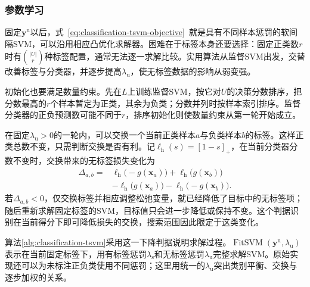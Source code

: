 \subsubsection{参数学习}
\label{sec:classification-tsvm-learning}

固定$\bm{y}^{\mathrm{u}}$以后，式~\eqref{eq:classification-tsvm-objective}~就是具有不同样本惩罚的软间隔SVM，可以沿用相应凸优化求解器。困难在于标签本身还要选择：固定正类数$r$时有$\binom{|U|}{r}$种标签配置，通常无法逐一求解比较。实用算法从监督SVM出发，交替改善标签与分类器，并逐步提高$\lambda_{\mathrm{u}}$，使无标签数据的影响从弱变强。

初始化也要满足数量约束。先在$L$上训练监督SVM，按它对$U$的决策分数排序，把分数最高的$r$个样本暂定为正类，其余为负类；分数并列时按样本索引排序。监督分类器的正负预测数可能不同于$r$，排序初始化则使数量约束从第一轮开始成立。

在固定$\lambda_{\mathrm{u}}>0$的一轮内，可以交换一个当前正类样本$a$与负类样本$b$的标签。这样正类总数不变，只需判断交换是否有利。记$\ell_{\mathrm{h}}(s)=[1-s]_+$，在当前分类器分数不变时，交换带来的无标签损失变化为
\begin{equation}
  \label{eq:classification-tsvm-swap}
  \begin{aligned}
    \Delta_{a,b}
      ={}&\ell_{\mathrm{h}}\bigl(-g(\bm{x}_a)\bigr)
          +\ell_{\mathrm{h}}\bigl(g(\bm{x}_b)\bigr)\\
       &-\ell_{\mathrm{h}}\bigl(g(\bm{x}_a)\bigr)
          -\ell_{\mathrm{h}}\bigl(-g(\bm{x}_b)\bigr).
  \end{aligned}
\end{equation}
若$\Delta_{a,b}<0$，仅交换标签并相应调整松弛变量，就已经降低了目标中的无标签项；随后重新求解固定标签的SVM，目标值只会进一步降低或保持不变。这个判据识别在当前得分下即可降低损失的交换，搜索范围因此限定于这类变化。

算法\ref{alg:classification-tsvm}采用这一下降判据说明求解过程。$\operatorname{FitSVM}(\bm{y}^{\mathrm{u}},\lambda_{\mathrm{u}})$表示在当前固定标签下，用有标签惩罚$\lambda_{\mathrm{s}}$和无标签惩罚$\lambda_{\mathrm{u}}$完整求解SVM。原始实现还可以为未标注正负类使用不同惩罚；这里用统一的$\lambda_{\mathrm{u}}$突出类别平衡、交换与逐步加权的关系。

